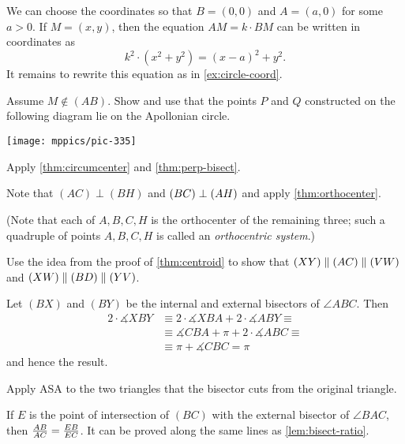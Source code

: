 We can choose the coordinates so that $B=(0,0)$ and $A=(a,0)$ for some $a>0$.
If $M=(x,y)$, then the equation $AM=k\cdot BM$ can be written in coordinates as 
\[k^2\cdot(x^2+y^2)=(x-a)^2+y^2.\]
It remains to rewrite this equation as in \ref{ex:circle-coord}.

Assume $M\notin(AB)$.
Show and use that the points $P$ and $Q$ constructed on the following diagram lie on the Apollonian circle.

\begin{Figure}
\centering
\texttt{[image: mppics/pic-335]}
\end{Figure}


\setcounter{eqtn}{0}

Apply \ref{thm:circumcenter} and \ref{thm:perp-bisect}.

Note that $(AC)\perp (BH)$ and $(BC)\perp (AH)$ and apply \ref{thm:orthocenter}.

(Note that each of $A,B,C,H$ is the orthocenter of the remaining three; such a quadruple of points $A,B,C,H$ is called an \emph{orthocentric system}.)

Use the idea from the proof of \ref{thm:centroid}
to show that $(XY)\parallel (AC)\parallel (VW)$ and
$(XW)\parallel (BD)\parallel (YV)$.

Let $(BX)$ and $(BY)$ be the internal and external bisectors of $\angle ABC$.
Then 
\begin{align*}
2\cdot \measuredangle XBY&\equiv2\cdot \measuredangle XBA+2\cdot \measuredangle ABY\equiv
\\
&\equiv
\measuredangle CBA+\pi+2\cdot \measuredangle ABC\equiv
\\
&\equiv\pi+\measuredangle CBC=\pi
\end{align*}
and hence the result.

Apply ASA to the two triangles that the bisector cuts from the original triangle. 

If $E$ is the point of intersection of $(BC)$ 
with the external bisector of $\angle BAC$, then 
$\frac{AB}{AC}=\frac{EB}{EC}$.
It can be proved along the same lines as \ref{lem:bisect-ratio}.


